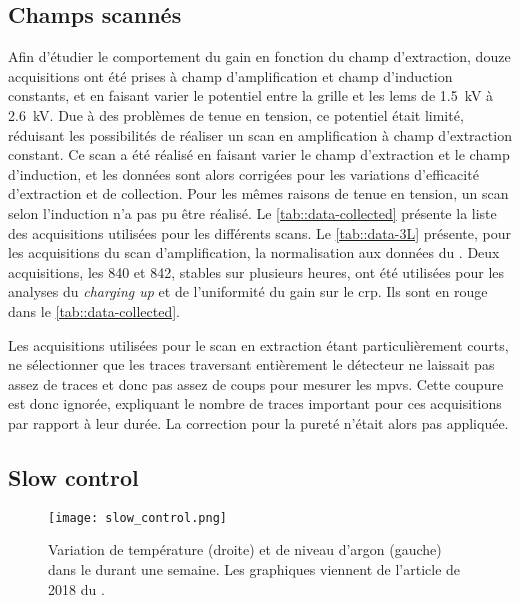     \subsection{Champs scannés}

      
      

      Afin d'étudier le comportement du gain en fonction du champ d'extraction, douze acquisitions ont été prises à champ d'amplification et champ d'induction constants, et en faisant varier le potentiel entre la grille et les \glspl{lem} de \SI{1.5}{\kilo\volt} à \SI{2.6}{\kilo\volt}. Due à des problèmes de tenue en tension, ce potentiel était limité, réduisant les possibilités de réaliser un scan en amplification à champ d'extraction constant. Ce scan a été réalisé en faisant varier le champ d'extraction et le champ d'induction, et les données sont alors corrigées pour les variations d'efficacité d'extraction et de collection. Pour les mêmes raisons de tenue en tension, un scan selon l'induction n'a pas pu être réalisé. Le \autoref{tab::data-collected} présente la liste des acquisitions utilisées pour les différents scans. Le \autoref{tab::data-3L} présente, pour les acquisitions du scan d'amplification, la normalisation aux données du \threeL{}. Deux acquisitions, les 840 et 842, stables sur plusieurs heures, ont été utilisées pour les analyses du \textit{charging up} et de l'uniformité du gain sur le \gls{crp}. Ils sont en rouge dans le \autoref{tab::data-collected}.

      Les acquisitions utilisées pour le scan en extraction étant particulièrement courts, ne sélectionner que les traces traversant entièrement le détecteur ne laissait pas assez de traces et donc pas assez de coups pour mesurer les \glspl{mpv}. Cette coupure est donc ignorée, expliquant le nombre de traces important pour ces acquisitions par rapport à leur durée. La correction pour la pureté n'était alors pas appliquée.

    \subsection{Slow control}\label{sec::slow_control}

      \begin{figure}[htbp]
        \centering
        \texttt{[image: slow\_control.png]}
        \caption[Variation de température et de niveau d'argon dans le \TOO{}]{\label{fig::slow_control}Variation de température (droite) et de niveau d'argon (gauche) dans le \TOO{} durant une semaine. Les graphiques viennent de l'article de 2018 du \TOO{} \cite{Aimard2018}.}
      \end{figure}

